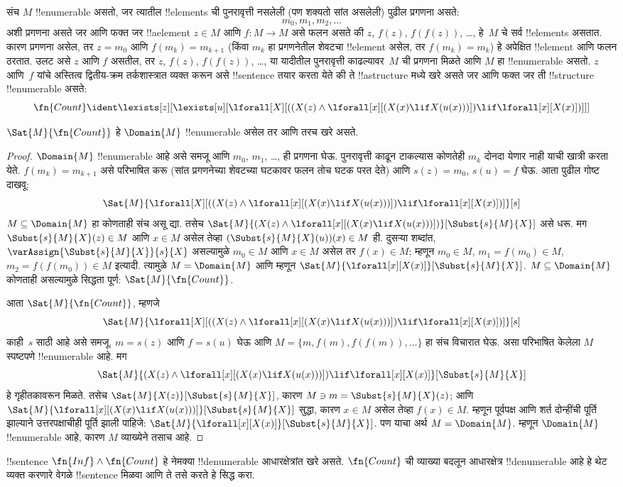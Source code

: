 \documentclass[../../../include/open-logic-section]{subfiles}
\begin{document}
संच $M$
!!{enumerable}
असतो, जर
त्यातील
!!{element}s
ची पुनरावृत्ती
नसलेली
(पण शक्यतो
सांत असलेली)
पुढील
प्रगणना असते:
\[
m_0, m_1, m_2, \dots
\]
अशी प्रगणना
असते जर
आणि फक्त
जर
!!a{element}
$z \in M$
आणि
$f\colon M \to M$
असे फलन
असते की
$z$, $f(z)$,
$f(f(z))$, \dots,
हे~$M$
चे सर्व
!!{element}s
असतात.
कारण प्रगणना
असेल, तर
$z = m_0$
आणि
$f(m_k) = m_{k+1}$
(किंवा
$m_k$ हा
प्रगणनेतील
शेवटचा
!!{element}
असेल, तर
$f(m_k) = m_k$)
हे अपेक्षित
!!{element}
आणि फलन
ठरतात.
उलट असे
$z$ आणि
$f$ असतील,
तर
$z$, $f(z)$,
$f(f(z))$, \dots,
या यादीतील पुनरावृत्ती
काढल्यावर~$M$ ची प्रगणना
मिळते आणि
$M$ हा
!!{enumerable}
असतो.
$z$ आणि~$f$
यांचे अस्तित्व
द्वितीय-क्रम
तर्कशास्त्रात
व्यक्त करून
असे
!!{sentence}
तयार करता
येते की
ते
!!a{structure}
मध्ये खरे
असते जर
आणि फक्त
जर ती
!!{structure}
!!{enumerable}
असते:
\[
\fn{Count} \ident
\lexists[z][\lexists[u][\lforall[X][((X(z) \land
      \lforall[x][(X(x) \lif X(u(x)))]) \lif \lforall[x][X(x)])]]]
\]

\begin{prop}
$\Sat{M}{\fn{Count}}$
हे
$\Domain{M}$
!!{enumerable}
असेल तर
आणि तरच
खरे असते.
\end{prop}

\begin{proof}
$\Domain{M}$
!!{enumerable}
आहे असे
समजू आणि
$m_0$, $m_1$,
\dots, ही
प्रगणना घेऊ.
पुनरावृत्ती
काढून टाकल्यास
कोणतेही
$m_k$ दोनदा
येणार नाही
याची खात्री
करता येते.
$f(m_k) = m_{k+1}$
असे परिभाषित
करू (सांत
प्रगणनेच्या
शेवटच्या घटकावर
फलन तोच घटक
परत देते)
आणि
$s(z) = m_0$,
$s(u) = f$
घेऊ.
आता पुढील
गोष्ट दाखवू:
\[
\Sat{M}{\lforall[X][((X(z) \land \lforall[x][(X(x) \lif X(u(x)))])
    \lif \lforall[x][X(x)])]}[s]
\]
$M \subseteq \Domain{M}$
हा कोणताही
संच असू
द्या.
तसेच
$\Sat{M}{(X(z) \land \lforall[x][(X(x) \lif
X(u(x)))])}[\Subst{s}{M}{X}]$
असे धरू.
मग
$\Subst{s}{M}{X}(z) \in M$
आणि
$x \in M$
असेल तेव्हा
$(\Subst{s}{M}{X}(u))(x) \in M$
ही.
दुसऱ्या
शब्दांत,
$\varAssign{\Subst{s}{M}{X}}{s}{X}$
असल्यामुळे
$m_0 \in M$
आणि
$x \in M$
असेल तर
$f(x) \in M$;
म्हणून
$m_0 \in M$,
$m_1 = f(m_0) \in M$,
$m_2 = f(f(m_0)) \in M$
इत्यादी.
त्यामुळे
$M = \Domain{M}$
आणि म्हणून
$\Sat{M}{\lforall[x][X(x)]}[\Subst{s}{M}{X}]$.
$M \subseteq
\Domain{M}$
कोणताही
असल्यामुळे
सिद्धता पूर्ण:
$\Sat{M}{\fn{Count}}$.

आता
$\Sat{M}{\fn{Count}}$,
म्हणजे
\[
\Sat{M}{\lforall[X][((X(z) \land \lforall[x][(X(x) \lif X(u(x)))])
    \lif \lforall[x][X(x)])]}[s]
\]
काही~$s$
साठी आहे
असे समजू.
$m = s(z)$
आणि
$f = s(u)$
घेऊ आणि
$M = \{m,
f(m), f(f(m)), \dots\}$
हा संच
विचारात
घेऊ.
असा
परिभाषित
केलेला
$M$
स्पष्टपणे
!!{enumerable}
आहे.
मग
\[
\Sat{M}{(X(z) \land \lforall[x][(X(x) \lif X(u(x)))])
    \lif \lforall[x][X(x)]}[\Subst{s}{M}{X}]
\]
हे गृहीतकावरून
मिळते.
तसेच
$\Sat{M}{X(z)}[\Subst{s}{M}{X}]$,
कारण
$M \ni m =
\Subst{s}{M}{X}(z)$;
आणि
$\Sat{M}{\lforall[x][(X(x) \lif
X(u(x)))]}[\Subst{s}{M}{X}]$
सुद्धा,
कारण
$x \in M$
असेल तेव्हा
$f(x) \in
M$.
म्हणून
पूर्वपक्ष
आणि शर्त
दोन्हींची
पूर्ति
झाल्याने
उत्तरपक्षाचीही
पूर्ति झाली
पाहिजे:
$\Sat{M}{\lforall[x][X(x)]}[\Subst{s}{M}{X}]$.
पण याचा
अर्थ
$M = \Domain{M}$.
म्हणून
$\Domain{M}$
!!{enumerable}
आहे, कारण
$M$ व्याख्येने
तसाच आहे.
\end{proof}

\begin{prob}
!!{sentence}
$\fn{Inf} \land \fn{Count}$
हे नेमक्या
!!{denumerable}
आधारक्षेत्रांत
खरे असते.
$\fn{Count}$
ची व्याख्या
बदलून
आधारक्षेत्र
!!{denumerable}
आहे हे
थेट व्यक्त
करणारे
वेगळे
!!{sentence}
मिळवा आणि
ते तसे
करते हे
सिद्ध करा.
\end{prob}
\end{document}

